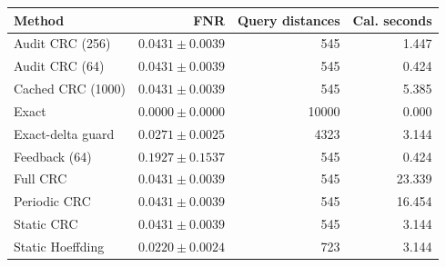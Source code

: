\begin{tabular}{lrrr}
\hline
Method & FNR & Query distances & Cal. seconds \\
\hline
Audit CRC (256) & $0.0431 \pm 0.0039$ & 545 & 1.447 \\
Audit CRC (64) & $0.0431 \pm 0.0039$ & 545 & 0.424 \\
Cached CRC (1000) & $0.0431 \pm 0.0039$ & 545 & 5.385 \\
Exact & $0.0000 \pm 0.0000$ & 10000 & 0.000 \\
Exact-delta guard & $0.0271 \pm 0.0025$ & 4323 & 3.144 \\
Feedback (64) & $0.1927 \pm 0.1537$ & 545 & 0.424 \\
Full CRC & $0.0431 \pm 0.0039$ & 545 & 23.339 \\
Periodic CRC & $0.0431 \pm 0.0039$ & 545 & 16.454 \\
Static CRC & $0.0431 \pm 0.0039$ & 545 & 3.144 \\
Static Hoeffding & $0.0220 \pm 0.0024$ & 723 & 3.144 \\
\hline
\end{tabular}
